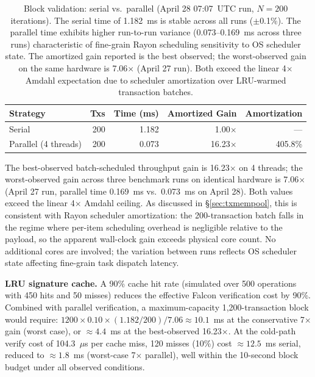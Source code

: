 \documentclass[11pt,a4paper]{article}
\begin{document}
\begin{table}[h]
\centering\small
\begin{tabular}{@{}lrrrr@{}}
\toprule
\textbf{Strategy} & \textbf{Txs} & \textbf{Time (ms)} & \textbf{Amortized Gain} & \textbf{Amortization} \\
\midrule
Serial              & 200 & 1.182 & 1.00$\times$  & --- \\
Parallel (4 threads)& 200 & 0.073 & 16.23$\times$ & 405.8\% \\
\bottomrule
\end{tabular}
\caption{Block validation: serial vs.\ parallel (April 28 07:07~UTC run, $N=200$
iterations). The serial time of 1.182~ms is stable across all runs ($\pm$0.1\%).
The parallel time exhibits higher run-to-run variance (0.073--0.169~ms across
three runs) characteristic of fine-grain Rayon scheduling sensitivity to OS
scheduler state. The amortized gain reported is the best observed; the
worst-observed gain on the same hardware is 7.06$\times$ (April 27 run).
Both exceed the linear 4$\times$ Amdahl expectation due to scheduler amortization
over LRU-warmed transaction batches.}
\label{tab:blockverify}
\end{table}

The best-observed batch-scheduled throughput gain is 16.23$\times$ on 4 threads;
the worst-observed gain across three benchmark runs on identical hardware is 7.06$\times$
(April 27 run, parallel time 0.169~ms vs.\ 0.073~ms on April 28). Both values
exceed the linear 4$\times$ Amdahl ceiling. As discussed in \S\ref{sec:txmempool},
this is consistent with Rayon scheduler amortization: the 200-transaction batch
falls in the regime where per-item scheduling overhead is negligible relative
to the payload, so the apparent wall-clock gain exceeds physical core count.
No additional cores are involved; the variation between runs reflects OS
scheduler state affecting fine-grain task dispatch latency.

\textbf{LRU signature cache.}
A 90\% cache hit rate (simulated over 500 operations with 450 hits and 50 misses)
reduces the effective Falcon verification cost by 90\%. Combined with parallel
verification, a maximum-capacity 1,200-transaction block would require:
$1200 \times 0.10 \times (1.182/200) / 7.06 \approx 10.1$~ms at the conservative
7$\times$ gain (worst case), or $\approx 4.4$~ms at the best-observed 16.23$\times$.
At the cold-path verify cost of 104.3~$\mu$s per cache miss, 120 misses (10\%)
cost $\approx 12.5$~ms serial, reduced to $\approx 1.8$~ms (worst-case
7$\times$ parallel), well within the 10-second block budget under all observed
conditions.
\end{document}
